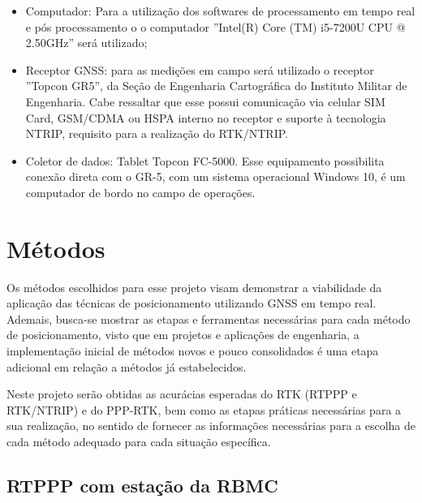 \begin{itemize}
\item Computador: Para a utilização dos softwares de processamento em tempo real e pós processamento o o computador ''Intel(R) Core (TM) i5-7200U CPU @ 2.50GHz'' será utilizado;

\item Receptor GNSS: para as medições em campo será utilizado o receptor ”Topcon GR5”, da Seção de Engenharia Cartográfica do Instituto Militar de Engenharia. Cabe ressaltar que esse possui comunicação via celular SIM Card, GSM/CDMA ou HSPA interno no receptor e suporte à tecnologia NTRIP, requisito para a realização do RTK/NTRIP.

\item Coletor de dados: Tablet Topcon FC-5000. Esse equipamento possibilita conexão direta com o GR-5, com um sistema operacional Windows 10, é um computador de bordo no campo de operações.
         
\end{itemize}


\section{Métodos}
\noindent

Os métodos escolhidos para esse projeto visam demonstrar a viabilidade da aplicação das técnicas de posicionamento utilizando GNSS em tempo real. Ademais, busca-se mostrar as etapas e ferramentas necessárias para cada método de posicionamento, visto que em projetos e aplicações de engenharia, a implementação inicial de métodos novos e pouco consolidados é uma etapa adicional em relação a métodos já estabelecidos.

Neste projeto serão obtidas as acurácias esperadas do RTK (RTPPP e RTK/NTRIP) e do PPP-RTK, bem como as etapas práticas necessárias para a sua realização, no sentido de fornecer as informações necessárias para a escolha de cada método adequado para cada situação específica.

\subsection{RTPPP com estação da RBMC}

